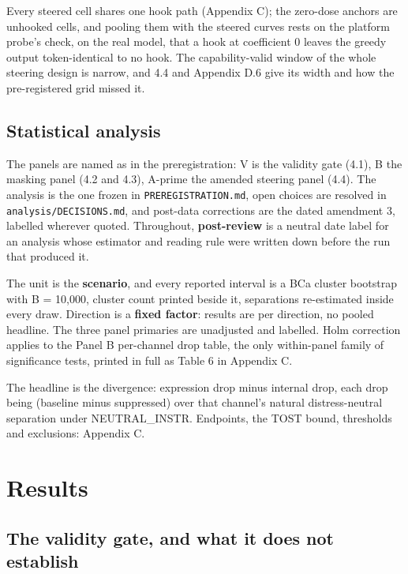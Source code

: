 \documentclass[11pt,a4paper]{article}
\begin{document}
Every steered cell shares one hook path (Appendix C); the zero-dose anchors are unhooked cells, and pooling them with the steered curves rests on the platform probe's check, on the real model, that a hook at coefficient 0 leaves the greedy output token-identical to no hook. The capability-valid window of the whole steering design is narrow, and 4.4 and Appendix D.6 give its width and how the pre-registered grid missed it.

\subsection{Statistical analysis}

The panels are named as in the preregistration: V is the validity gate (4.1), B the masking panel (4.2 and 4.3), A-prime the amended steering panel (4.4). The analysis is the one frozen in \texttt{PREREGISTRATION.md}, open choices are resolved in \texttt{analysis/\allowbreak{}DECISIONS.md}, and post-data corrections are the dated amendment 3, labelled wherever quoted. Throughout, \textbf{post-review} is a neutral date label for an analysis whose estimator and reading rule were written down before the run that produced it.

The unit is the \textbf{scenario}, and every reported interval is a BCa cluster bootstrap with B = 10{,}000, cluster count printed beside it, separations re-estimated inside every draw. Direction is a \textbf{fixed factor}: results are per direction, no pooled headline. The three panel primaries are unadjusted and labelled. Holm correction applies to the Panel B per-channel drop table, the only within-panel family of significance tests, printed in full as Table 6 in Appendix C.

The headline is the divergence: expression drop minus internal drop, each drop being (baseline minus suppressed) over that channel's natural distress-neutral separation under NEUTRAL\_INSTR. Endpoints, the TOST bound, thresholds and exclusions: Appendix C.

\section{Results}

\subsection{The validity gate, and what it does not establish}
\end{document}
